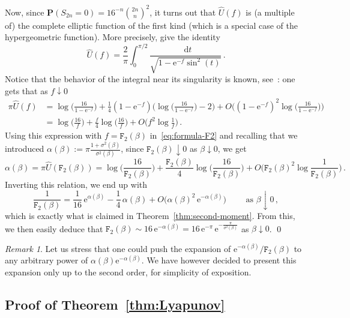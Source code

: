 \documentclass[11pt]{amsart}
\numberwithin{equation}{section}
\newcommand*{\bP}{\mathbf{P}}
\newcommand{\e}{\mathrm{e}}
\newcommand*{\tF}{\mathtt{F}}
\newcommand*\dd{\mathop{}\!\mathrm{d}}
\theoremstyle{plain}
\theoremstyle{definition}
\theoremstyle{remark}
\newtheorem{remark}[theorem]{Remark}
\begin{document}
Now, since \(\bP(S_{2n}=0) = 16^{-n} \binom{2n}{n}^2\), it turns out that \(\hat U(f)\) is (a multiple of) the complete elliptic function of the first kind (which is a special case of the hypergeometric function).
More precisely, \cite[Eq.~\href{https://dlmf.nist.gov/19.2.E8}{(19.2.8)} and Eq.~\href{https://dlmf.nist.gov/19.5.E1}{(19.5.1)}]{DLMF} give the identity
\[
\hat U(f) = \frac{2}{\pi} \int_0^{\pi/2} \frac{\dd t}{ \sqrt{1- \e^{-f} \sin^2(t)}} \,.
\]
Notice that the behavior of the integral near its singularity is known, see~\cite[Eq.~\href{https://dlmf.nist.gov/19.12.E1}{(19.12.1)}]{DLMF}: one gets that as \(f\downarrow 0\)
\[
\begin{split}
\pi \hat U(f) & = \log\Big(\frac{16}{1-\e^{-f}}\Big) + \frac14 (1-\e^{-f}) \Big( \log\Big(\frac{16}{1-\e^{-f}}\Big) -2\Big) + O\Big( (1-\e^{-f})^2 \log\Big(\frac{16}{1-\e^{-f}}\Big) \Big) \\
& = \log\Big(\frac{16}{f}\Big) + \frac{f}{4} \log\Big(\frac{16}{f}\Big) + O\Big( f^2 \log \frac{1}{f} \Big) \,.
\end{split}
\]
Using this expression with \(f = \tF_2(\beta)\) in~\eqref{eq:formula-F2} and recalling that we introduced \(\alpha(\beta) := \pi \frac{1+\sigma^2(\beta)}{\sigma^2(\beta)}\), since \(\tF_2(\beta)\downarrow 0\) as \(\beta\downarrow 0\), we get
\[
\alpha(\beta) = \pi \hat U(\tF_2(\beta)) = \log\Big(\frac{16}{\tF_2(\beta)}\Big) + \frac{\tF_2(\beta)}{4} \log\Big(\frac{16}{\tF_2(\beta)}\Big) + O\Big( \tF_2(\beta)^2 \log \frac{1}{\tF_2(\beta)} \Big)\,.
\]
Inverting this relation, we end up with 
\[
\frac{1}{\tF_2(\beta)} = \frac{1}{16}\, \e^{\alpha(\beta)} - \frac{1}{4}\, \alpha(\beta) +O\big(\alpha(\beta)^2\, \e^{-\alpha(\beta)}\big) \qquad \text{ as } \beta\downarrow 0 \,,
\]
which is exactly what is claimed in Theorem~\ref{thm:second-moment}.
From this, we then easily deduce that \(\tF_2(\beta) \sim 16 \, \e^{-\alpha(\beta)}  = 16\, \e^{-\pi}\, \e^{-\frac{\pi}{\sigma^2(\beta)}}\) as \(\beta\downarrow 0\).
\qed

\begin{remark}
       Let us stress that one could push the expansion of \(\e^{-\alpha(\beta)}/\tF_2(\beta)\) to any arbitrary power of \(\alpha(\beta) \e^{-\alpha(\beta)}\).
       We have however decided to present this expansion only up to the second order, for simplicity of exposition.
\end{remark}



\subsection{Proof of Theorem~\ref{thm:Lyapunov}}
\label{sec:moments}
\end{document}
